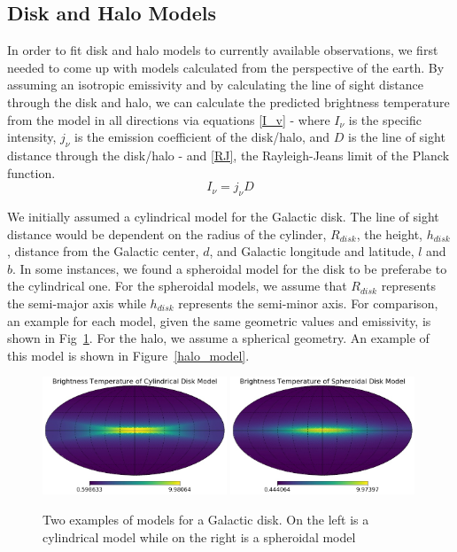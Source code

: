 \documentclass[%
onecolumn,
11pt,
tightenlines,
notitlepage,
superscriptaddress,
nofootinbib,
amsmath,amssymb,
aps,
pra,
]{revtex4-1}
\begin{document}
\subsection{Disk and Halo Models}
In order to fit disk and halo models to currently available observations, we first needed to come up with models calculated from the perspective of the earth. By assuming an isotropic emissivity and by calculating the line of sight distance through the disk and halo, we can calculate the predicted brightness temperature from the model in all directions via equations \ref{I_v} - where $I_{\nu}$ is the specific intensity, $j_{\nu}$ is the emission coefficient of the disk/halo, and $D$ is the line of sight distance through the disk/halo - and \ref{RJ}, the Rayleigh-Jeans limit of the Planck function.
\begin{equation}
I_{\nu} = j_{\nu}D
\label{I_v}
\end{equation}

We initially assumed a cylindrical model for the Galactic disk. The line of sight distance would be dependent on the radius of the cylinder, $R_{disk}$, the height, $h_{disk}$, distance from the Galactic center, $d$, and Galactic longitude and latitude, $l$ and $b$. In some instances, we found a spheroidal model for the disk to be preferabe to the cylindrical one. For the spheroidal models, we assume that $R_{disk}$ represents the semi-major axis while $h_{disk}$ represents the semi-minor axis. For comparison, an example for each model, given the same geometric values and emissivity, is shown in Fig~\ref{disk_models}. For the halo, we assume a spherical geometry. An example of this model is shown in Figure~\ref{halo_model}.


\begin{figure}[h]
\begin{center}
\includegraphics[width=0.49\textwidth]{example_disk.jpg}
\includegraphics[width=0.49\textwidth]{example_sph.jpg}
\caption{Two examples of models for a Galactic disk. On the left is a cylindrical model while on the right is a spheroidal model}
\label{disk_models}
\end{center}
\end{figure}
\end{document}
